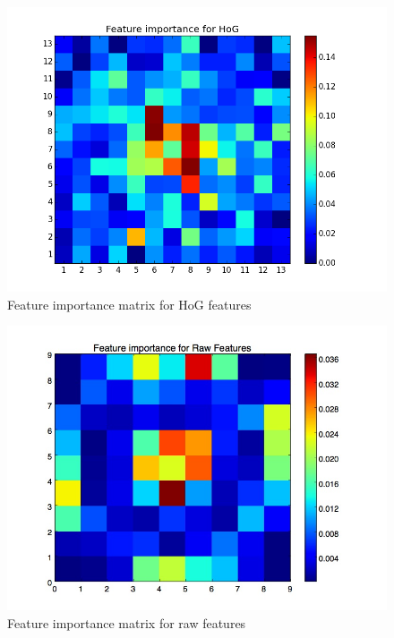 \documentclass[10pt]{article}
\begin{document}
\begin{figure}
\begin{center}
\includegraphics[scale=0.4]{images/HoG_DT_Heatmap.png}
\caption{Feature importance matrix for HoG features}
\label{fig:hogdtheat}
\end{center}
\end{figure}

\begin{figure}
\begin{center}
\includegraphics[scale=0.4]{images/Raw_Features_DT_Heatmap.jpg}
\caption{Feature importance matrix for raw features}
\label{fig:rawdtheat}
\end{center}
\end{figure}
\end{document}
